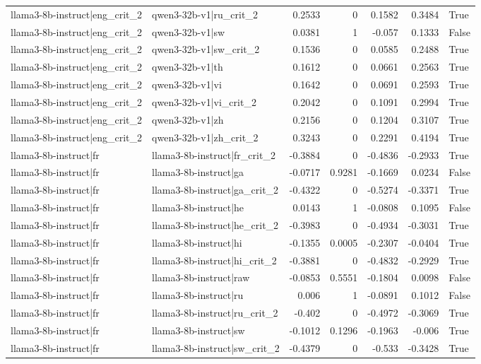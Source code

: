 \begin{table}
\begin{tabular}{l l r r r r l}
llama3-8b-instruct|eng_crit_2 & qwen3-32b-v1|ru_crit_2 & 0.2533 & 0 & 0.1582 & 0.3484 & True \\
llama3-8b-instruct|eng_crit_2 & qwen3-32b-v1|sw & 0.0381 & 1 & -0.057 & 0.1333 & False \\
llama3-8b-instruct|eng_crit_2 & qwen3-32b-v1|sw_crit_2 & 0.1536 & 0 & 0.0585 & 0.2488 & True \\
llama3-8b-instruct|eng_crit_2 & qwen3-32b-v1|th & 0.1612 & 0 & 0.0661 & 0.2563 & True \\
llama3-8b-instruct|eng_crit_2 & qwen3-32b-v1|vi & 0.1642 & 0 & 0.0691 & 0.2593 & True \\
llama3-8b-instruct|eng_crit_2 & qwen3-32b-v1|vi_crit_2 & 0.2042 & 0 & 0.1091 & 0.2994 & True \\
llama3-8b-instruct|eng_crit_2 & qwen3-32b-v1|zh & 0.2156 & 0 & 0.1204 & 0.3107 & True \\
llama3-8b-instruct|eng_crit_2 & qwen3-32b-v1|zh_crit_2 & 0.3243 & 0 & 0.2291 & 0.4194 & True \\
llama3-8b-instruct|fr & llama3-8b-instruct|fr_crit_2 & -0.3884 & 0 & -0.4836 & -0.2933 & True \\
llama3-8b-instruct|fr & llama3-8b-instruct|ga & -0.0717 & 0.9281 & -0.1669 & 0.0234 & False \\
llama3-8b-instruct|fr & llama3-8b-instruct|ga_crit_2 & -0.4322 & 0 & -0.5274 & -0.3371 & True \\
llama3-8b-instruct|fr & llama3-8b-instruct|he & 0.0143 & 1 & -0.0808 & 0.1095 & False \\
llama3-8b-instruct|fr & llama3-8b-instruct|he_crit_2 & -0.3983 & 0 & -0.4934 & -0.3031 & True \\
llama3-8b-instruct|fr & llama3-8b-instruct|hi & -0.1355 & 0.0005 & -0.2307 & -0.0404 & True \\
llama3-8b-instruct|fr & llama3-8b-instruct|hi_crit_2 & -0.3881 & 0 & -0.4832 & -0.2929 & True \\
llama3-8b-instruct|fr & llama3-8b-instruct|raw & -0.0853 & 0.5551 & -0.1804 & 0.0098 & False \\
llama3-8b-instruct|fr & llama3-8b-instruct|ru & 0.006 & 1 & -0.0891 & 0.1012 & False \\
llama3-8b-instruct|fr & llama3-8b-instruct|ru_crit_2 & -0.402 & 0 & -0.4972 & -0.3069 & True \\
llama3-8b-instruct|fr & llama3-8b-instruct|sw & -0.1012 & 0.1296 & -0.1963 & -0.006 & True \\
llama3-8b-instruct|fr & llama3-8b-instruct|sw_crit_2 & -0.4379 & 0 & -0.533 & -0.3428 & True \\

\end{tabular}
\end{table}
